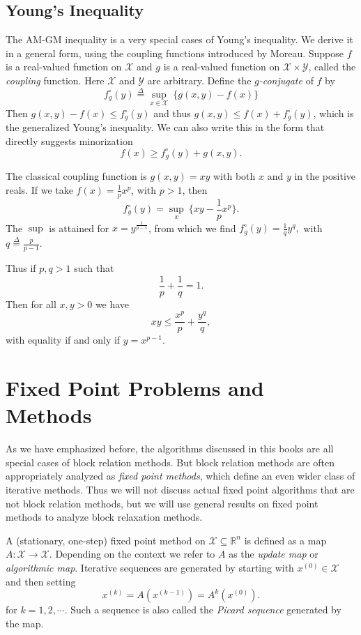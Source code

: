 \documentclass[
  12pt,
]{book}
\begin{document}
\hypertarget{youngs-inequality}{%
\subsection{Young's Inequality}\label{youngs-inequality}}

The AM-GM inequality is a very special cases of Young's inequality. We derive it in a general form, using the coupling functions introduced by Moreau.
Suppose \(f\) is a real-valued function on \(\mathcal{X}\) and \(g\) is a real-valued function on \(\mathcal{X}\times\mathcal{Y}\), called the \emph{coupling} function. Here \(\mathcal{X}\) and \(\mathcal{Y}\) are arbitrary. Define the \emph{\(g\)-conjugate} of \(f\) by
\[
f^\circ_g(y)\mathop{=}\limits^{\Delta}\sup_{x\in\mathcal{X}}\ \{g(x,y)-f(x)\}
\]
Then \(g(x,y)-f(x)\leq f^\circ_g(y)\) and thus \(g(x,y)\leq f(x)+f^\circ_g(y)\), which is the generalized Young's inequality. We can also write this in the form that directly suggests minorization
\[
f(x)\geq f^\circ_g(y)+g(x,y).
\]

The classical coupling function is \(g(x,y)=xy\) with both \(x\) and \(y\) in the positive reals. If we
take \(f(x)=\frac{1}{p}x^p\), with \(p>1\), then
\[
f^\circ_g(y)=\sup_{x}\ \{xy-\frac{1}{p}x^p\}.
\]
The \(\sup\) is attained for \(x=y^{\frac{1}{p-1}}\), from which we find \(f^\circ_g(y)=\frac{1}{q}y^q,\)
with \(q\mathop{=}\limits^{\Delta}\frac{p}{p-1}\).

Thus if \(p,q>1\) such that
\[
\frac{1}{p}+\frac{1}{q}=1.
\]
Then for all \(x,y>0\) we have
\[
xy\leq\frac{x^p}{p}+\frac{y^q}{q},
\]
with equality if and only if \(y=x^{p-1}\).

\hypertarget{background:fixedpoint}{%
\section{Fixed Point Problems and Methods}\label{background:fixedpoint}}

As we have emphasized before, the algorithms discussed in this books are all special cases of block relation methods. But block relation methods are often appropriately analyzed as \emph{fixed point methods}, which define an even wider class of iterative methods.
Thus we will not discuss actual fixed point algorithms that are not block relation methods, but we will use general results on fixed point methods to analyze block relaxation methods.

A (stationary, one-step) fixed point method on \(\mathcal{X}\subseteq\mathbb{R}^n\) is defined as a map \(A:\mathcal{X}\rightarrow\mathcal{X}\).
Depending on the context we refer to \(A\) as the \emph{update map} or \emph{algorithmic map}.
Iterative sequences are generated by
starting with \(x^{(0)}\in\mathcal{X}\) and then
setting
\[
x^{(k)}=A(x^{(k-1)})=A^k(x^{(0)}).
\]
for \(k=1,2,\cdots\).
Such a sequence is also called the \emph{Picard sequence} generated by the map.
\end{document}
